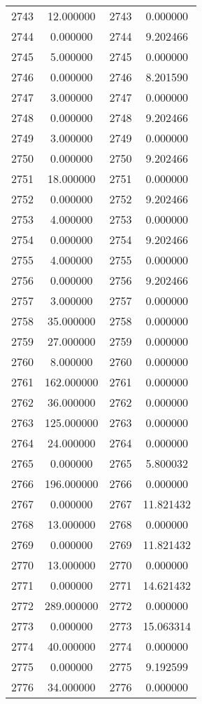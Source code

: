\documentclass[12pt]{article}
\begin{document}
\begin{longtable}{@{}cccc@{}}
2743 & 12.000000 & 2743 & 0.000000 \\
2744 & 0.000000 & 2744 & 9.202466 \\
2745 & 5.000000 & 2745 & 0.000000 \\
2746 & 0.000000 & 2746 & 8.201590 \\
2747 & 3.000000 & 2747 & 0.000000 \\
2748 & 0.000000 & 2748 & 9.202466 \\
2749 & 3.000000 & 2749 & 0.000000 \\
2750 & 0.000000 & 2750 & 9.202466 \\
2751 & 18.000000 & 2751 & 0.000000 \\
2752 & 0.000000 & 2752 & 9.202466 \\
2753 & 4.000000 & 2753 & 0.000000 \\
2754 & 0.000000 & 2754 & 9.202466 \\
2755 & 4.000000 & 2755 & 0.000000 \\
2756 & 0.000000 & 2756 & 9.202466 \\
2757 & 3.000000 & 2757 & 0.000000 \\
2758 & 35.000000 & 2758 & 0.000000 \\
2759 & 27.000000 & 2759 & 0.000000 \\
2760 & 8.000000 & 2760 & 0.000000 \\
2761 & 162.000000 & 2761 & 0.000000 \\
2762 & 36.000000 & 2762 & 0.000000 \\
2763 & 125.000000 & 2763 & 0.000000 \\
2764 & 24.000000 & 2764 & 0.000000 \\
2765 & 0.000000 & 2765 & 5.800032 \\
2766 & 196.000000 & 2766 & 0.000000 \\
2767 & 0.000000 & 2767 & 11.821432 \\
2768 & 13.000000 & 2768 & 0.000000 \\
2769 & 0.000000 & 2769 & 11.821432 \\
2770 & 13.000000 & 2770 & 0.000000 \\
2771 & 0.000000 & 2771 & 14.621432 \\
2772 & 289.000000 & 2772 & 0.000000 \\
2773 & 0.000000 & 2773 & 15.063314 \\
2774 & 40.000000 & 2774 & 0.000000 \\
2775 & 0.000000 & 2775 & 9.192599 \\
2776 & 34.000000 & 2776 & 0.000000 \\

\end{longtable}
\end{document}
